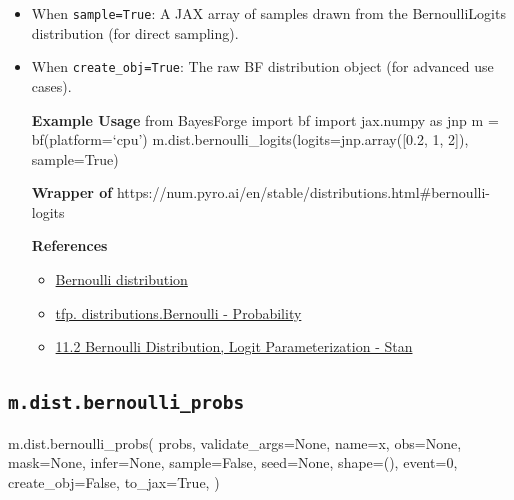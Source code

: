 \documentclass[
  letterpaper,
  DIV=11,
  numbers=noendperiod]{scrartcl}
\newenvironment{Shaded}{\begin{snugshade}}{\end{snugshade}}
\newcommand{\DecValTok}[1]{\textcolor[rgb]{0.68,0.00,0.00}{#1}}
\newcommand{\NormalTok}[1]{\textcolor[rgb]{0.00,0.23,0.31}{#1}}
\newcommand{\OperatorTok}[1]{\textcolor[rgb]{0.37,0.37,0.37}{#1}}
\newcommand{\StringTok}[1]{\textcolor[rgb]{0.13,0.47,0.30}{#1}}
\newcommand{\VariableTok}[1]{\textcolor[rgb]{0.07,0.07,0.07}{#1}}
\providecommand{\tightlist}{%
  \setlength{\itemsep}{0pt}\setlength{\parskip}{0pt}}\usepackage{longtable,booktabs,array}
\begin{document}
\begin{itemize}
\item
  When \texttt{sample=True}: A JAX array of samples drawn from the
  BernoulliLogits distribution (for direct sampling).
\item
  When \texttt{create\_obj=True}: The raw BF distribution object (for
  advanced use cases).

  \textbf{Example Usage} from BayesForge import bf import jax.numpy as
  jnp m = bf(platform=`cpu')
  m.dist.bernoulli\_logits(logits=jnp.array({[}0.2, 1, 2{]}),
  sample=True)

  \textbf{Wrapper of}
  https://num.pyro.ai/en/stable/distributions.html\#bernoulli-logits

  \textbf{References}

  \begin{itemize}
  \tightlist
  \item
    \href{https://en.wikipedia.org/wiki/Bernoulli_distribution}{Bernoulli
    distribution}
  \item
    \href{https://www.tensorflow.org/probability/api_docs/python/tfp/distributions/Bernoulli}{tfp.
    distributions.Bernoulli - Probability}
  \item
    \href{https://mc-stan.org/docs/2_19/functions-reference/bernoulli-logit-distribution.html}{11.2
    Bernoulli Distribution, Logit Parameterization - Stan}
  \end{itemize}
\end{itemize}

\subsection{\texorpdfstring{\texttt{m.dist.bernoulli\_probs}}{m.dist.bernoulli\_probs}}\label{bernoulli_probs}

\begin{Shaded}
\begin{Highlighting}[]
\NormalTok{m.dist.bernoulli\_probs(}
\NormalTok{    probs,}
\NormalTok{    validate\_args}\OperatorTok{=}\VariableTok{None}\NormalTok{,}
\NormalTok{    name}\OperatorTok{=}\StringTok{\textquotesingle{}x\textquotesingle{}}\NormalTok{,}
\NormalTok{    obs}\OperatorTok{=}\VariableTok{None}\NormalTok{,}
\NormalTok{    mask}\OperatorTok{=}\VariableTok{None}\NormalTok{,}
\NormalTok{    infer}\OperatorTok{=}\VariableTok{None}\NormalTok{,}
\NormalTok{    sample}\OperatorTok{=}\VariableTok{False}\NormalTok{,}
\NormalTok{    seed}\OperatorTok{=}\VariableTok{None}\NormalTok{,}
\NormalTok{    shape}\OperatorTok{=}\NormalTok{(),}
\NormalTok{    event}\OperatorTok{=}\DecValTok{0}\NormalTok{,}
\NormalTok{    create\_obj}\OperatorTok{=}\VariableTok{False}\NormalTok{,}
\NormalTok{    to\_jax}\OperatorTok{=}\VariableTok{True}\NormalTok{,}
\NormalTok{)}
\end{Highlighting}
\end{Shaded}
\end{document}
